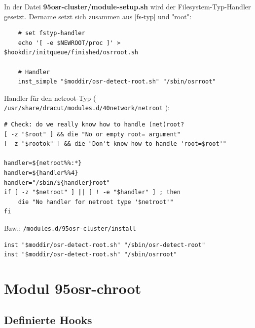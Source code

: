 \documentclass[10pt,a4paper]{article}
\begin{document}
\bigskip
In der Datei \textbf{95osr-cluster/module-setup.sh} wird der Filesystem-Typ-Handler gesetzt. Dername setzt sich zusammen aus [fs-typ] und "root":

\bigskip

\begin{lstlisting}
    # set fstyp-handler
    echo '[ -e $NEWROOT/proc ]' > $hookdir/initqueue/finished/osrroot.sh

    # Handler
    inst_simple "$moddir/osr-detect-root.sh" "/sbin/osrroot"
\end{lstlisting}


\bigskip

Handler für den netroot-Typ ( \texttt{/usr/share/dracut/modules.d/40network/netroot} ):

\bigskip

\begin{lstlisting}
# Check: do we really know how to handle (net)root?
[ -z "$root" ] && die "No or empty root= argument"
[ -z "$rootok" ] && die "Don't know how to handle 'root=$root'"

handler=${netroot%%:*}
handler=${handler%%4}
handler="/sbin/${handler}root"
if [ -z "$netroot" ] || [ ! -e "$handler" ] ; then
    die "No handler for netroot type '$netroot'"
fi
\end{lstlisting}

\bigskip

Bzw.: \texttt{/modules.d/95osr-cluster/install}

\bigskip

\begin{lstlisting}
inst "$moddir/osr-detect-root.sh" "/sbin/osr-detect-root"
inst "$moddir/osr-detect-root.sh" "/sbin/osrroot"
\end{lstlisting}



\section{Modul 95osr-chroot}

\subsection{Definierte Hooks}
\end{document}

